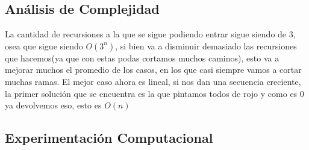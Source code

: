 \subsection*{Análisis de Complejidad}
La cantidad de recursiones a la que se sigue podiendo entrar sigue siendo de 3, osea que sigue siendo $O(3^n)$, si bien va a disminuir demasiado las recursiones que hacemos(ya que con estas podas cortamos muchos caminos), esto va a mejorar muchos el promedio de los casos, en los que casi siempre vamos a cortar muchas ramas. El mejor caso ahora es lineal, si nos dan una secuencia creciente, la primer solución que se encuentra es la que pintamos todos de rojo y como es 0 ya devolvemos eso, esto es $O(n)$ 

\subsection*{Experimentación Computacional}
